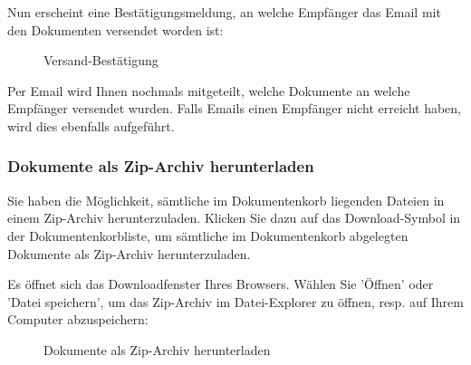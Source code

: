 Nun erscheint eine Bestätigungsmeldung, an welche Empfänger das Email mit den Dokumenten versendet worden ist:

\begin{figure}[H]
\caption{Versand-Bestätigung}
\end{figure}

Per Email wird Ihnen nochmals mitgeteilt, welche Dokumente an welche Empfänger versendet wurden. Falls Emails einen Empfänger nicht erreicht haben, wird dies ebenfalls aufgeführt.

\vspace{\baselineskip}

\subsubsection{Dokumente als Zip-Archiv herunterladen}

Sie haben die Möglichkeit, sämtliche im Dokumentenkorb liegenden Dateien in einem Zip-Archiv herunterzuladen. Klicken Sie dazu auf das Download-Symbol in der Dokumentenkorbliste, um sämtliche im Dokumentenkorb abgelegten Dokumente als Zip-Archiv herunterzuladen.

\vspace{\baselineskip}

Es öffnet sich das Downloadfenster Ihres Browsers. Wählen Sie 'Öffnen' oder 'Datei speichern', um das Zip-Archiv im Datei-Explorer zu öffnen, resp. auf Ihrem Computer abzuspeichern:

\begin{figure}[H]
\caption{Dokumente als Zip-Archiv herunterladen}
\end{figure}

